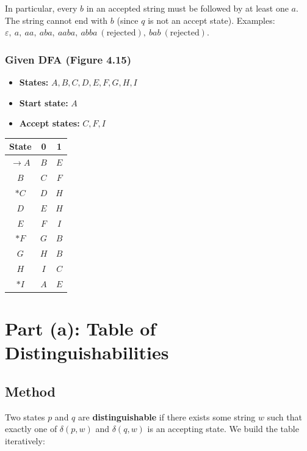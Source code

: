 \documentclass{article}
\theoremstyle{theorem}
\theoremstyle{definition}
\theoremstyle{remark}
\begin{document}
In particular, every $b$ in an accepted string must be followed by at least one $a$. The string cannot end with $b$ (since $q$ is not an accept state). Examples: $\varepsilon,\ a,\ aa,\ aba,\ aaba,\ abba\ (\text{rejected}),\ bab\ (\text{rejected})$.

\subsubsection*{Given DFA (Figure 4.15)}

\begin{itemize}
    \item \textbf{States:} $A, B, C, D, E, F, G, H, I$
    \item \textbf{Start state:} $A$
    \item \textbf{Accept states:} $C, F, I$
\end{itemize}

\begin{center}
\begin{tabular}{c||c|c}
\toprule
\textbf{State} & \textbf{0} & \textbf{1} \\
\midrule
$\rightarrow A$ & $B$ & $E$ \\
$B$             & $C$ & $F$ \\
$*C$            & $D$ & $H$ \\
$D$             & $E$ & $H$ \\
$E$             & $F$ & $I$ \\
$*F$            & $G$ & $B$ \\
$G$             & $H$ & $B$ \\
$H$             & $I$ & $C$ \\
$*I$            & $A$ & $E$ \\
\bottomrule
\end{tabular}
\end{center}

\section*{Part (a): Table of Distinguishabilities}

\subsection*{Method}

Two states $p$ and $q$ are \textbf{distinguishable} if there exists some string $w$ such that exactly one of $\delta(p,w)$ and $\delta(q,w)$ is an accepting state. We build the table iteratively:
\end{document}
